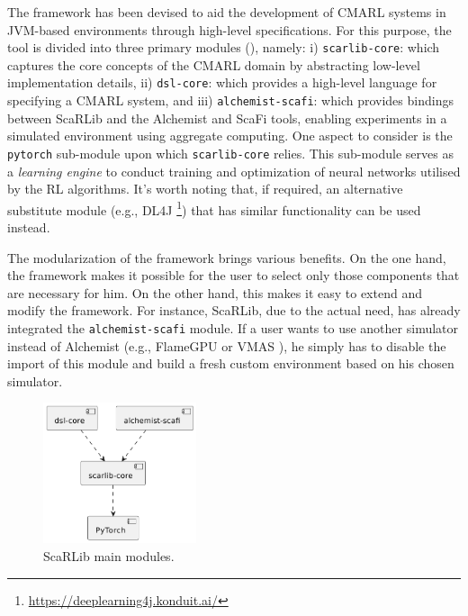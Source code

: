 \documentclass[12pt,a4paper,openright,twoside]{book}
\begin{document}
The framework has been devised to aid the development of CMARL systems in JVM-based environments through high-level 
    specifications. For this purpose, the tool is divided into three primary modules (), namely:
    i) \texttt{scarlib-core}:  which captures the core concepts of the CMARL domain by abstracting low-level 
        implementation details,
    ii) \texttt{dsl-core}: which provides a high-level language for specifying a CMARL system, and
    iii) \texttt{alchemist-scafi}: which provides bindings between ScaRLib and the Alchemist and ScaFi tools, enabling 
        experiments in a simulated environment using aggregate computing.
    One aspect to consider is the \texttt{pytorch} sub-module upon which \texttt{scarlib-core} relies. This sub-module serves as 
    a \emph{learning engine} to conduct training and optimization of neural networks utilised by the RL algorithms. 
    It's worth noting that, if required, an alternative substitute module (e.g., DL4J \footnote{\url{https://deeplearning4j.konduit.ai/}})
    that has similar functionality can be used instead.

The modularization of the framework brings various benefits. On the one hand, the framework makes it possible 
    for the user to select only those components that are necessary for him. On the other hand, this makes it 
    easy to extend and modify the framework. For instance, ScaRLib, due to the actual need, has already 
    integrated the \texttt{alchemist-scafi} module. If a user wants to use another simulator instead of Alchemist 
    (e.g., FlameGPU \cite{flame} or VMAS \cite{bettini2022vmas}), he simply has to disable the import of this module and build a fresh 
    custom environment based on his chosen simulator.

\begin{figure}
    \centering
    \includegraphics[width=0.4\textwidth]{figures/scarlib-modules.pdf}
    \caption{ScaRLib main modules.}
    \label{fig:mainmodules}
\end{figure}
\end{document}
